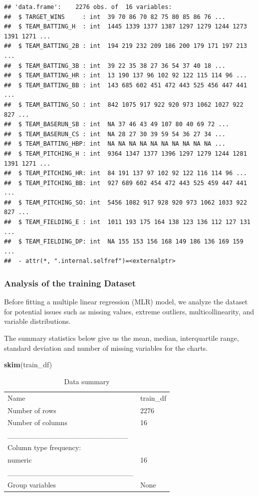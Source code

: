 \documentclass[
]{article}
\newenvironment{Shaded}{\begin{snugshade}}{\end{snugshade}}
\newcommand{\FunctionTok}[1]{\textcolor[rgb]{0.13,0.29,0.53}{\textbf{#1}}}
\newcommand{\NormalTok}[1]{#1}
\begin{document}
\begin{verbatim}
## 'data.frame':    2276 obs. of  16 variables:
##  $ TARGET_WINS     : int  39 70 86 70 82 75 80 85 86 76 ...
##  $ TEAM_BATTING_H  : int  1445 1339 1377 1387 1297 1279 1244 1273 1391 1271 ...
##  $ TEAM_BATTING_2B : int  194 219 232 209 186 200 179 171 197 213 ...
##  $ TEAM_BATTING_3B : int  39 22 35 38 27 36 54 37 40 18 ...
##  $ TEAM_BATTING_HR : int  13 190 137 96 102 92 122 115 114 96 ...
##  $ TEAM_BATTING_BB : int  143 685 602 451 472 443 525 456 447 441 ...
##  $ TEAM_BATTING_SO : int  842 1075 917 922 920 973 1062 1027 922 827 ...
##  $ TEAM_BASERUN_SB : int  NA 37 46 43 49 107 80 40 69 72 ...
##  $ TEAM_BASERUN_CS : int  NA 28 27 30 39 59 54 36 27 34 ...
##  $ TEAM_BATTING_HBP: int  NA NA NA NA NA NA NA NA NA NA ...
##  $ TEAM_PITCHING_H : int  9364 1347 1377 1396 1297 1279 1244 1281 1391 1271 ...
##  $ TEAM_PITCHING_HR: int  84 191 137 97 102 92 122 116 114 96 ...
##  $ TEAM_PITCHING_BB: int  927 689 602 454 472 443 525 459 447 441 ...
##  $ TEAM_PITCHING_SO: int  5456 1082 917 928 920 973 1062 1033 922 827 ...
##  $ TEAM_FIELDING_E : int  1011 193 175 164 138 123 136 112 127 131 ...
##  $ TEAM_FIELDING_DP: int  NA 155 153 156 168 149 186 136 169 159 ...
##  - attr(*, ".internal.selfref")=<externalptr>
\end{verbatim}

\subsubsection{Analysis of the training
Dataset}\label{analysis-of-the-training-dataset}

Before fitting a multiple linear regression (MLR) model, we analyze the
dataset for potential issues such as missing values, extreme outliers,
multicollinearity, and variable distributions.

The summary statistics below give us the mean, median, interquartile
range, standard deviation and number of missing variables for the
charts.

\begin{Shaded}
\begin{Highlighting}[]
\FunctionTok{skim}\NormalTok{(train\_df)}
\end{Highlighting}
\end{Shaded}

\begin{longtable}[]{@{}ll@{}}
\caption{Data summary}\tabularnewline
\toprule\noalign{}
\endfirsthead
\endhead
\bottomrule\noalign{}
\endlastfoot
Name & train\_df \\
Number of rows & 2276 \\
Number of columns & 16 \\
\_\_\_\_\_\_\_\_\_\_\_\_\_\_\_\_\_\_\_\_\_\_\_ & \\
Column type frequency: & \\
numeric & 16 \\
\_\_\_\_\_\_\_\_\_\_\_\_\_\_\_\_\_\_\_\_\_\_\_\_ & \\
Group variables & None \\
\end{longtable}
\end{document}
